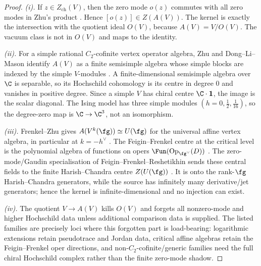 \begin{proof}
\emph{(i).} If \(z\in Z_{\mathrm{ch}}(V)\), then the zero mode
\(o(z)\) commutes with all zero modes in Zhu's product
\cite[Theorem~2.1.2]{Zhu96}. Hence \([o(z)]\in Z(A(V))\). The kernel
is exactly the intersection with the quotient ideal \(O(V)\), because
\(A(V)=V/O(V)\). The vacuum class is not in \(O(V)\) and maps to the
identity.

\emph{(ii).} For a simple rational \(C_2\)-cofinite vertex operator
algebra, Zhu and Dong--Li--Mason identify \(A(V)\) as a finite
semisimple algebra whose simple blocks are indexed by the simple
\(V\)-modules \cite{Zhu96,DLM98}. A finite-dimensional semisimple
algebra over \(\C\) is separable, so its Hochschild cohomology is its
centre in degree \(0\) and vanishes in positive degree.  Since a
simple \(V\) has chiral centre \(\C\cdot\mathbf1\), the image is the
scalar diagonal. The Ising model has three simple modules
\((h=0,\frac12,\frac1{16})\), so the degree-zero map is
\(\C\to\C^3\), not an isomorphism.

\emph{(iii).} Frenkel--Zhu gives \(A(V^k(\fg))\simeq U(\fg)\) for the
universal affine vertex algebra, in particular at \(k=-h^\vee\)
\cite{FrenkelZhu92}. The Feigin--Frenkel centre at the critical level
is the polynomial algebra of functions on opers
\(\Fun(\mathrm{Op}_{\fg^\vee}(D))\)
\cite{FeiginFrenkel1992,Frenkel2007}. The zero-mode/Gaudin
specialisation of Feigin--Frenkel--Reshetikhin sends these central
fields to the finite Harish--Chandra centre \(Z(U(\fg))\)
\cite{FFR94}. It is onto the rank-\(\fg\) Harish--Chandra generators,
while the source has infinitely many derivative/jet generators; hence
the kernel is infinite-dimensional and no injection can exist.

\emph{(iv).} The quotient \(V\to A(V)\) kills \(O(V)\) and forgets all
nonzero-mode and higher Hochschild data unless additional comparison
data is supplied. The listed families are precisely loci where this
forgotten part is load-bearing: logarithmic extensions retain
pseudotrace and Jordan data, critical affine algebras retain the
Feigin--Frenkel oper directions, and non-\(C_2\)-cofinite/generic
families need the full chiral Hochschild complex rather than the
finite zero-mode shadow.
\end{proof}

